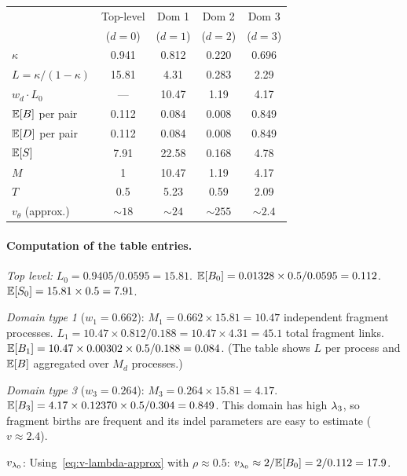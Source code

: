 \begin{center}
\renewcommand{\arraystretch}{1.3}
\begin{tabular}{lcccc}
\toprule
& Top-level & Dom 1 & Dom 2 & Dom 3 \\
& ($d{=}0$) & ($d{=}1$) & ($d{=}2$) & ($d{=}3$) \\
\midrule
$\kappa$ & 0.941 & 0.812 & 0.220 & 0.696 \\
$L = \kappa/(1{-}\kappa)$ & 15.81 & 4.31 & 0.283 & 2.29 \\
$w_d \cdot L_0$ & --- & 10.47 & 1.19 & 4.17 \\
$\mathbb{E}[B]$ per pair & 0.112 & 0.084 & 0.008 & 0.849 \\
$\mathbb{E}[D]$ per pair & 0.112 & 0.084 & 0.008 & 0.849 \\
$\mathbb{E}[S]$ & 7.91 & 22.58 & 0.168 & 4.78 \\
$M$ & 1 & 10.47 & 1.19 & 4.17 \\
$T$ & 0.5 & 5.23 & 0.59 & 2.09 \\
$v_\theta$ (approx.) & $\sim 18$ & $\sim 24$ & $\sim 255$ & $\sim 2.4$ \\
\bottomrule
\end{tabular}
\end{center}

\paragraph{Computation of the table entries.}

\emph{Top level:}
$L_0 = 0.9405 / 0.0595 = 15.81$.
$\mathbb{E}[B_0] = 0.01328 \times 0.5 / 0.0595 = 0.112$.
$\mathbb{E}[S_0] = 15.81 \times 0.5 = 7.91$.

\emph{Domain type 1} ($w_1 = 0.662$):
$M_1 = 0.662 \times 15.81 = 10.47$ independent fragment processes.
$L_1 = 10.47 \times 0.812/0.188 = 10.47 \times 4.31 = 45.1$ total fragment links.
$\mathbb{E}[B_1] = 10.47 \times 0.00302 \times 0.5/0.188 = 0.084$.
(The table shows $L$ per process and $\mathbb{E}[B]$ aggregated over $M_d$ processes.)

\emph{Domain type 3} ($w_3 = 0.264$):
$M_3 = 0.264 \times 15.81 = 4.17$.
$\mathbb{E}[B_3] = 4.17 \times 0.12370 \times 0.5/0.304 = 0.849$.
This domain has high $\lambda_3$, so fragment births are frequent
and its indel parameters are easy to estimate ($v \approx 2.4$).

$v_{\lambda_0}$: Using~\eqref{eq:v-lambda-approx} with $\rho \approx 0.5$:
$v_{\lambda_0} \approx 2/\mathbb{E}[B_0] = 2/0.112 = 17.9$.

